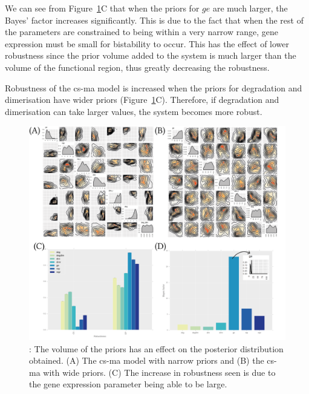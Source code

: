 We can see from Figure~\ref{fig:priors_matter}C that when the priors for $ge$ are much larger, the Bayes' factor increases significantly. This is due to the fact that when the rest of the parameters are constrained to being within a very narrow range, gene expression must be small for bistability to occur. This has the effect of lower robustness since the prior volume added to the system is much larger than the volume of the functional region, thus greatly decreasing the robustness.

Robustness of the \acrshort{cs-ma} model is increased when the priors for degradation and dimerisation have wider priors (Figure~\ref{fig:priors_matter}C). Therefore, if degradation and dimerisation can take larger values, the system becomes more robust.
 

\begin{figure}[h]
\begin{center}
\includegraphics[width=\textwidth]{../../chapters/chapterStabilityFinder/images/priors_matter.png}
\caption[LoF caption]{ \label{fig:priors_matter}: The volume of the priors has an effect on the posterior distribution obtained. (A) The \acrshort{cs-ma} model with narrow priors and (B) the \acrshort{cs-ma} with wide priors. (C) The increase in robustness seen is due to the gene expression parameter being able to be large.}
\end{center}
\end{figure}
\clearpage
 
